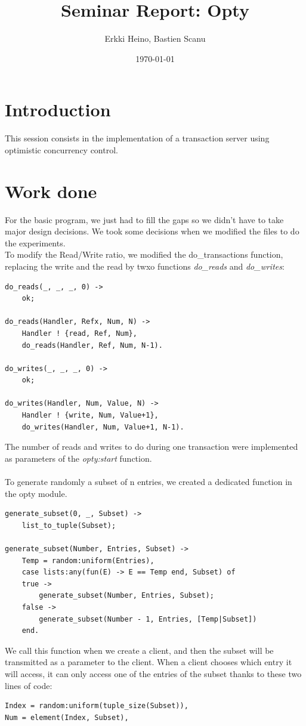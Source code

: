\documentclass[a4paper, 11pt]{article}
\title{Seminar Report: Opty}
\author{Erkki Heino, Bastien Scanu}
\date{\today{}}
\begin{document}
\maketitle

\section{Introduction}
This session consists in the implementation of a transaction server using optimistic concurrency control.


\section{Work done}
For the basic program, we just had to fill the gaps so we didn't have to take major design decisions. We took some decisions when we modified the files to do the experiments.\\
To modify the Read/Write ratio, we modified the do\_transactions function, replacing the write and the read by twxo functions \emph{do\_reads} and \emph{do\_writes}:
\lstset{language=erlang}   
\begin{lstlisting}
do_reads(_, _, _, 0) ->
    ok;

do_reads(Handler, Refx, Num, N) ->
    Handler ! {read, Ref, Num},
    do_reads(Handler, Ref, Num, N-1).

do_writes(_, _, _, 0) ->
    ok;

do_writes(Handler, Num, Value, N) ->
    Handler ! {write, Num, Value+1},
    do_writes(Handler, Num, Value+1, N-1).

\end{lstlisting}
The number of reads and writes to do during one transaction were implemented as parameters of the \emph{opty:start} function.\\ \\ 

To generate randomly a subset of n entries, we created a dedicated function in the opty module.
\begin{lstlisting}
generate_subset(0, _, Subset) ->
    list_to_tuple(Subset);

generate_subset(Number, Entries, Subset) ->
    Temp = random:uniform(Entries),
    case lists:any(fun(E) -> E == Temp end, Subset) of
	true ->
	    generate_subset(Number, Entries, Subset);
	false ->
	    generate_subset(Number - 1, Entries, [Temp|Subset])
    end.
\end{lstlisting}

We call this function when we create a client, and then the subset will be transmitted as a parameter to the client. When a client chooses which entry it will access, it can only access one of the entries of the subset thanks to these two lines of code:
\begin{lstlisting}
Index = random:uniform(tuple_size(Subset)),
Num = element(Index, Subset),
\end{lstlisting}
\end{document}

